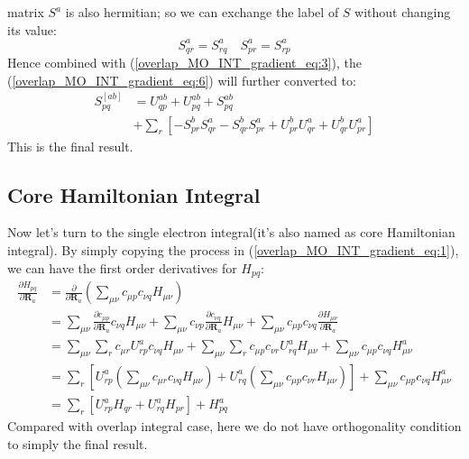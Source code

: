 matrix $S^{a}$ is also hermitian; so we can exchange the label of $S$ without
changing its value:
\begin{equation}
 \label{overlap_MO_INT_gradient_eq:7}
S^{a}_{qr} = S^{a}_{rq} \quad S^{a}_{pr} = S^{a}_{rp}
\end{equation}
Hence combined with (\ref{overlap_MO_INT_gradient_eq:3}), the
(\ref{overlap_MO_INT_gradient_eq:6}) will further converted to:
\begin{align}
 \label{overlap_MO_INT_gradient_eq:8}
S_{pq}^{[ab]} &=  U^{ab}_{qp}  + U^{ab}_{pq} + S^{ab}_{pq} \nonumber \\
&+ \sum_{r}\left[ -S^{b}_{pr} S^{a}_{qr}  - S^{b}_{qr} S^{a}_{pr}
+U^{b}_{pr}U^{a}_{qr} +U^{b}_{qr}U^{a}_{pr}\right]
\end{align}
This is the final result.

\subsection{Core Hamiltonian Integral}
%
%
Now let's turn to the single electron integral(it's also named as core
Hamiltonian integral). By simply copying the process in
(\ref{overlap_MO_INT_gradient_eq:1}), we can have the first order derivatives
for $H_{pq}$:
\begin{align}
\label{core_Hamiltonian_MO_INT_gradient_eq:1}
\frac{\partial H_{pq}}{\partial \bm{R}_{a}} &= \frac{\partial}{\partial
\bm{R}_{a}}\left( \sum_{\mu\nu}c_{\mu p}c_{\nu q}H_{\mu\nu}\right) \nonumber\\
&= \sum_{\mu\nu}\frac{\partial c_{\mu p}}{\partial \bm{R}_{a}}c_{\nu
q}H_{\mu\nu} + \sum_{\mu\nu}c_{\nu p}\frac{\partial c_{\nu  q}}{\partial
\bm{R}_{a}}H_{\mu\nu} + \sum_{\mu\nu}c_{\mu p}c_{\nu q}\frac{\partial
H_{\mu\nu}}{\partial \bm{R}_{a}} \nonumber\\
&= \sum_{\mu\nu}\sum_{r}c_{\mu r}U^{a}_{rp}c_{\nu
q}H_{\mu\nu} + \sum_{\mu\nu}\sum_{r}c_{\mu p}c_{\nu r}U^{a}_{rq}H_{\mu\nu} +
\sum_{\mu\nu}c_{\mu p}c_{\nu q}H^{a}_{\mu\nu} \nonumber \\
&= \sum_{r}\left[U^{a}_{rp} \left( \sum_{\mu\nu}c_{\mu r}c_{\nu
q}H_{\mu\nu}\right)  + U^{a}_{rq}\left( \sum_{\mu\nu}c_{\mu p}c_{\nu
r}H_{\mu\nu}\right) \right]  + \sum_{\mu\nu}c_{\mu p}c_{\nu q}H^{a}_{\mu\nu}
\nonumber \\
&= \sum_{r}\left[U^{a}_{rp}H_{qr} + U^{a}_{rq}H_{pr}\right]  + H^{a}_{pq}
\end{align}
Compared with overlap integral case, here we do not have orthogonality
condition to simply the final result.

